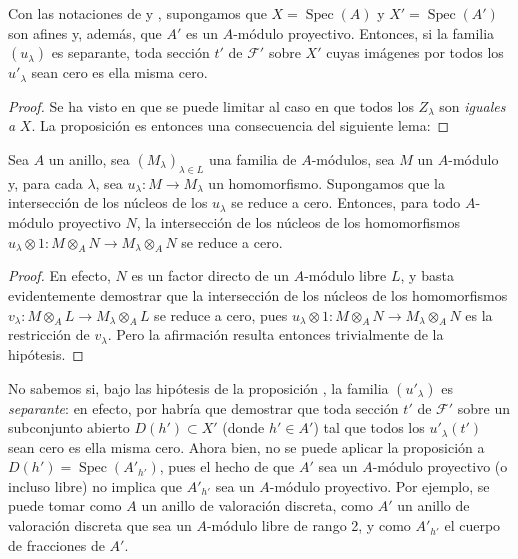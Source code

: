 \begin{proposition}[11.9.7]
\label{IV.11.9.7}
Con las notaciones de  y , supongamos que $X=\operatorname{Spec}(A)$ y $X'=\operatorname{Spec}(A')$ son afines y, además, que $A'$ es un $A$-módulo proyectivo.
Entonces, si la familia $(u_\lambda)$ es separante, toda sección $t'$ de $\mathcal F'$ sobre $X'$ cuyas imágenes por todos los $u'_\lambda$ sean cero es ella misma cero.
\end{proposition}

\begin{proof}
Se ha visto en  que se puede limitar al caso en que todos los $Z_\lambda$ son \emph{iguales a} $X$.
La proposición es entonces una consecuencia del siguiente lema:
\end{proof}

\begin{lemma}[11.9.7.1]
\label{IV.11.9.7.1}
Sea $A$ un anillo, sea $(M_\lambda)_{\lambda\in L}$ una familia de $A$-módulos, sea $M$ un $A$-módulo y, para cada $\lambda$, sea $u_\lambda:M\to M_\lambda$ un homomorfismo.
Supongamos que la intersección de los núcleos de los $u_\lambda$ se reduce a cero.
Entonces, para todo $A$-módulo proyectivo $N$, la intersección de los núcleos de los homomorfismos $u_\lambda\otimes 1:M\otimes_A N\to M_\lambda\otimes_A N$ se reduce a cero.
\end{lemma}

\begin{proof}
En efecto, $N$ es un factor directo de un $A$-módulo libre $L$, y basta evidentemente demostrar que la intersección de los núcleos de los homomorfismos $v_\lambda:M\otimes_A L\to M_\lambda\otimes_A L$ se reduce a cero, pues $u_\lambda\otimes 1:M\otimes_A N\to M_\lambda\otimes_A N$ es la restricción de $v_\lambda$.
Pero la afirmación resulta entonces trivialmente de la hipótesis.
\end{proof}

\begin{remarks}[11.9.8]
\label{IV.11.9.8}
No sabemos si, bajo las hipótesis de la proposición , la familia $(u'_\lambda)$ es \emph{separante}: en efecto, por  habría que demostrar que toda sección $t'$ de $\mathcal F'$ sobre un subconjunto abierto $D(h')\subset X'$ (donde $h'\in A'$) tal que todos los $u'_\lambda(t')$ sean cero es ella misma cero.
Ahora bien, no se puede aplicar la proposición  a $D(h')=\operatorname{Spec}(A'_{h'})$, pues el hecho de que $A'$ sea un $A$-módulo proyectivo (o incluso libre) no implica que $A'_{h'}$ sea un $A$-módulo proyectivo.
Por ejemplo, se puede tomar como $A$ un anillo de valoración discreta, como $A'$ un anillo de valoración discreta que sea un $A$-módulo libre de rango 2, y como $A'_{h'}$ el cuerpo de fracciones de $A'$.
\end{remarks}

